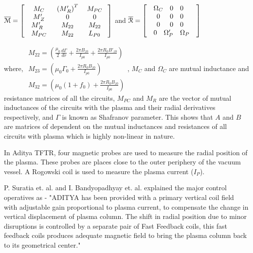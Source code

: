 $\overline{\cal{M}} = \left[ {\begin{array}{*{20}{c}}
	{{M_C}}&{{{\left( {M{'_R}} \right)}^T}}&{{M_{PC}}}\\
	{M{'_Z}}&0&0\\
	\begin{array}{l}
	M{'_R}\\
	{M_{PC}}
	\end{array}&\begin{array}{l}
	{M_{22}}\\
	{M_{22}}
	\end{array}&\begin{array}{l}
	{M_{22}}\\
	{L_{P0}}
	\end{array}
	\end{array}} \right]$ and $\overline{\cal{R}} = \left[ \begin{array}{l}
\begin{array}{*{20}{c}}
{{\Omega _C}}&0&0\\
0&0&0\\
0&0&0
\end{array}\\
\begin{array}{*{20}{c}}
0&{\Omega {'_P}}&{{\Omega _P}}
\end{array}
\end{array} \right]$

where, 
$\begin{array}{l}
{M_{22}} = \left( {\frac{{{\mu _0}}}{2}\frac{{d\Gamma }}{{dr}} + \frac{{2\pi {B_{z0}}}}{{{I_{p0}}}} + \frac{{2\pi {R_0}B{'_{z0}}}}{{{I_{p0}}}}} \right)\\
{M_{23}} = \left( {{\mu _0}{\Gamma _0} + \frac{{2\pi {R_0}{B_{z0}}}}{{{I_{p0}}}}} \right)\\
{M_{32}} = \left( {{\mu _0}\left( {1 + {f_0}} \right) + \frac{{2\pi {R_0}{B_{z0}}}}{{{I_{p0}}}}} \right)
\end{array}$,
${M_C}$ and ${\Omega _C}$ are mutual inductance and resistance matrices of all the circuits,
${M_{PC}}$ and ${M_R}$ are the vector of mutual inductances of the circuits with the plasma and their radial derivatives respectively, and
$\Gamma $ is known as Shafranov parameter. 
This shows that $ A $ and $ B $ are matrices of dependent on the mutual inductances and resistances of all circuits with plasma which is highly non-linear in nature. 

In Aditya TFTR, four magnetic probes are used to measure the radial position of the plasma. These probes are places close to the outer periphery of the vacuum vessel. A Rogowski coil is used to measure the plasma current ($I_P$).
\par
P. Suratia et. al. \cite{Suratia2012} and I. Bandyopadhyay et. al. \cite{bandyopadhyaya2004} explained the major control operatives as - "ADITYA has been provided with a primary vertical coil field with adjustable gain proportional to plasma current, to compensate the change in vertical displacement of plasma column. The shift in radial position due to minor disruptions is controlled by a separate pair of Fast Feedback coils, this fast feedback coils produces adequate magnetic field to bring the plasma column back to its geometrical center."

